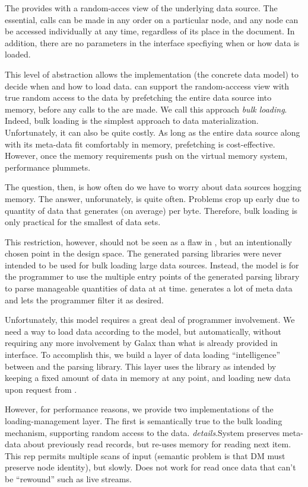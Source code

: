 The \padx \absdm provides \galax with a random-acces view
of the underlying data source. The essential,  calls
can be made in any order on a particular node, and any node can be
accessed individually at any time, regardless of its place in the
document. In addition, there are no parameters in the interface
specfiying when or how data is loaded.

This level of abstraction allows the \padx implementation (the
concrete data model) to decide when and how to load data.  \padx can
support the random-acccess view with true random access to the data by
prefetching the entire data source into memory, before any calls to
the \padx \absdm are made. We call this approach {\em bulk loading}.
Indeed, bulk loading is the simplest approach to data materialization.
Unfortunately, it can also be quite costly.  As long as the entire
data source along with its \pads meta-data fit comfortably in memory,
prefetching is cost-effective. However, once the memory requirements
push on the virtual memory system, performance plummets.

The question, then, is how often do we have to worry about data
sources hogging memory. The answer, unforunately, is quite often.
Problems crop up early due to quantity of data that \pads generates
(on average) per byte. Therefore, bulk loading is only practical for
the smallest of data sets.

This restriction, however, should not be seen as a flaw in \pads, but
an intentionally chosen point in the design space. The generated
parsing libraries were never intended to be used for bulk loading
large data sources. Instead, the \pads model is for the programmer to
use the multiple entry points of the generated parsing library to
parse manageable quantities of data at at time. \pads generates a lot
of meta data and lets the programmer filter it as desired.

Unfortunately, this model requires a great deal of programmer
involvement. We need a way to load data according to the \pads model,
but automatically, without requiring any more involvement by Galax
than what is already provided in interface. To accomplish this, we
build a layer of data loading ``intelligence'' between \galax and the
\padx parsing library.  This layer uses the library as intended by
keeping a fixed amount of data in memory at any point, and loading
new data upon request from \galax.

However, for performance reasons, we provide two implementations of
the loading-management layer. The first is semantically true to the
bulk loading mechanism, supporting random access to the data. {\em
  details}.System preserves meta-data about previously read records,
but re-uses memory for reading next item.  This rep permits multiple
scans of input (semantic problem is that DM must preserve node
identity), but slowly. Does not work for read once data that can't be
``rewound'' such as live streams.

